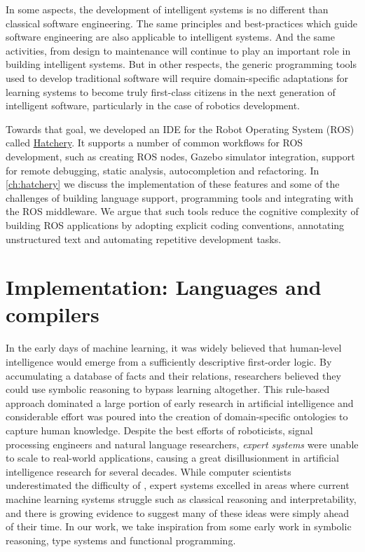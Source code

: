 \documentclass[12pt,initial,twoside,maitrise]{dms}
\numberwithin{equation}{section}
\numberwithin{table}{chapter}
\numberwithin{figure}{chapter}
\begin{document}
In some aspects, the development of intelligent systems is no different than classical software engineering. The same principles and best-practices which guide software engineering are also applicable to intelligent systems. And the same activities, from design to maintenance will continue to play an important role in building intelligent systems. But in other respects, the generic programming tools used to develop traditional software will require domain-specific adaptations for learning systems to become truly first-class citizens in the next generation of intelligent software, particularly in the case of robotics development.

Towards that goal, we developed an IDE for the Robot Operating System (ROS) called \href{https://github.com/duckietown/hatchery}{Hatchery}. It supports a number of common workflows for ROS development, such as creating ROS nodes, Gazebo simulator integration, support for remote debugging, static analysis, autocompletion and refactoring. In \autoref{ch:hatchery} we discuss the implementation of these features and some of the challenges of building language support, programming tools and integrating with the ROS middleware. We argue that such tools reduce the cognitive complexity of building ROS applications by adopting explicit coding conventions, annotating unstructured text and automating repetitive development tasks.

\section{Implementation: Languages and compilers}

In the early days of machine learning, it was widely believed that human-level intelligence would emerge from a sufficiently descriptive first-order logic. By accumulating a database of facts and their relations, researchers believed they could use symbolic reasoning to bypass learning altogether. This rule-based approach dominated a large portion of early research in artificial intelligence and considerable effort was poured into the creation of domain-specific ontologies to capture human knowledge. Despite the best efforts of roboticists, signal processing engineers and natural language researchers, \textit{expert systems} were unable to scale to real-world applications, causing a great disillusionment in artificial intelligence research for several decades. While computer scientists underestimated the difficulty of , expert systems excelled in areas where current machine learning systems struggle such as classical reasoning and interpretability, and there is growing evidence to suggest many of these ideas were simply ahead of their time. In our work, we take inspiration from some early work in symbolic reasoning, type systems and functional programming.
\end{document}
